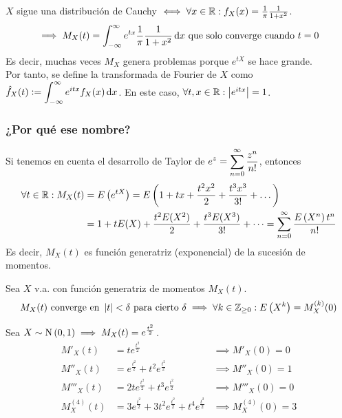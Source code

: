 
\begin{ejem}
	$X$ sigue una distribución de Cauchy $\iff \forall x \in \mathbb{R} : f_X(x) = \frac{1}{\pi} \frac{1}{1+x^2}$.
	\[\implies M_X(t) = \int_{-\infty}^{\infty} e^{tx} \frac{1}{\pi} \frac{1}{1+x^2}\odif{x} \tex{ que solo converge cuando }t=0\]
	Es decir, muchas veces $M_X$ genera problemas porque $e^{tX}$ se hace grande. \\
	Por tanto, se define la transformada de Fourier de $X$ como $\ds \hat{f}_X(t) \defeq \int_{-\infty}^{\infty} e^{itx}f_X(x)\odif{x}$. En este caso, $\forall t, x \in \mathbb{R} : \left|e^{itx}\right| = 1$.
\end{ejem}

\subsubsection{¿Por qué ese nombre?}

Si tenemos en cuenta el desarrollo de Taylor de $\displaystyle e^{z} = \sum_{n=0}^{\infty} \frac{z^n}{n!}$, entonces
\[\begin{aligned}
		\forall t\in \mathbb{R} : M_X(t) & = E\left(e^{tX}\right) = E\left(1 + tx + \frac{t^2x^2}{2} + \frac{t^3x^3}{3!} + \dots\right)                           \\
		                         & = 1 + tE(X) + \frac{t^2E(X^2)}{2} + \frac{t^3E(X^3)}{3!} + \dots = \sum_{n=0}^{\infty} \frac{E\left(X^n\right)t^n}{n!}
	\end{aligned}\]
Es decir, $M_X(t)$ es función generatriz (exponencial) de la sucesión de momentos.

\begin{teo}
	Sea $X$ v.a. con función generatriz de momentos $M_X(t)$.
	\[M_X(t) \text{ converge en }\left|t\right|< \delta \text{ para cierto }\delta \implies \forall k \in \mathbb{Z}_{\geq 0} : E\left(X^k\right) = M^{(k)}_X (0)\]
\end{teo}

\begin{ejem}
	Sea $X\sim\operatorname{N}\left(0,1\right) \implies M_X(t) = e^{\frac{t^2}{2}}$.
	\[\begin{aligned}
			M'_X(t)      & = te^{\frac{t^2}{2}}                                                & \implies M'_X(0) = 0      \\
			M''_X(t)     & = e^{\frac{t^2}{2}} + t^2e^{\frac{t^2}{2}}                          & \implies M''_X(0) = 1     \\
			M'''_X(t)    & = 2te^{\frac{t^2}{2}} + t^3e^{\frac{t^2}{2}}                        & \implies M'''_X(0) = 0    \\
			M^{(4)}_X(t) & = 3e^{\frac{t^2}{2}} + 3t^2e^{\frac{t^2}{2}} + t^4e^{\frac{t^2}{2}} & \implies M^{(4)}_X(0) = 3
		\end{aligned}\]
\end{ejem}

